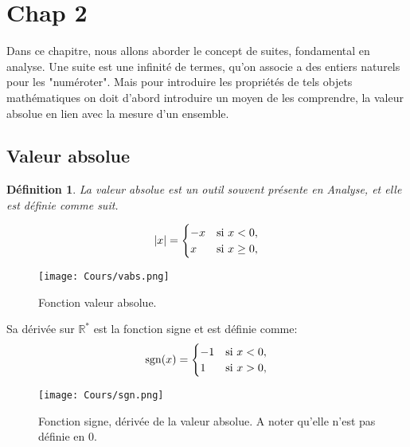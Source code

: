 \documentclass[a4paper, 12pt, french, twoside]{article}
\newtheorem{defi}[theorem]{Définition}
\newcommand{\Rr}{{\mathbb{R}}}
\begin{document}
\newpage
\section{Chap 2}
Dans ce chapitre, nous allons aborder le concept de suites, fondamental en analyse. Une suite est une infinité de termes, qu'on associe a des entiers naturels pour les "numéroter". Mais pour introduire les propriétés de tels objets mathématiques on doit d'abord introduire un moyen de les comprendre, la valeur absolue en lien avec la mesure d'un ensemble.
\subsection{Valeur absolue }
\begin{defi}
    La valeur absolue est un outil souvent présente en Analyse, et elle est définie comme suit.
\end{defi} 


\begin{equation}
|x|=
    \begin{cases}
        -x &{\rm si \,\, } x < 0 ,\\
        x &{\rm si \,\, } x \geq 0,
    \end{cases}
\end{equation}
\begin{figure}[H]
    \centering
    \texttt{[image: Cours/vabs.png]}
    \caption{Fonction valeur absolue.}
    \label{fig:enter-label}
\end{figure}

Sa dérivée sur $\Rr^*$ est la fonction signe et est définie comme:
\begin{equation}
{\rm sgn}(x)=
    \begin{cases}
        -1 &{\rm si \,\, } x < 0 ,\\
        1 &{\rm si \,\, } x > 0,
    \end{cases}
\end{equation}
\begin{figure}[H]
    \centering
    \texttt{[image: Cours/sgn.png]}
    \caption{Fonction signe, dérivée de la valeur absolue. A noter qu'elle n'est pas définie en 0.}
    \label{fig:enter-label}
\end{figure}
\end{document}
